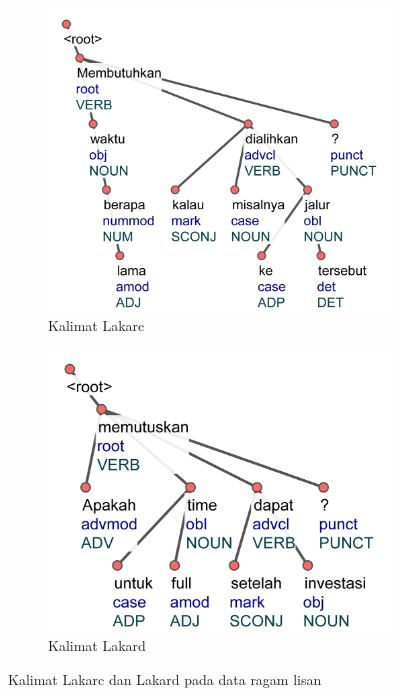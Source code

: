\begin{figure}
\centering

\begin{subfigure}{.49\linewidth}
  \centering
  \includegraphics[width=1\linewidth] {pics/ls4820.jpg} 
	\caption{Kalimat Lakarc}
	\label{fig:ls4820} 
\end{subfigure}
%
\begin{subfigure}{.41\linewidth}
  \centering
  \includegraphics[width=1\linewidth]{pics/ls1435.jpg} 
	\caption{Kalimat Lakard}
	\label{fig:ls1435} 
\end{subfigure}
\caption{Kalimat Lakarc dan Lakard pada data ragam lisan}
\label{fig:rootvalensi}
\end{figure}

